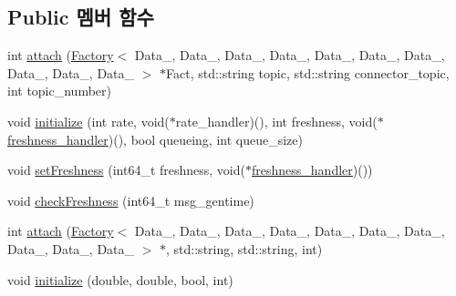 \subsection*{Public 멤버 함수}
\begin{DoxyCompactItemize}
\item 
int \hyperlink{classInputDataPort__Fac_a510e33d0b638c13d002e8e5bd0732ba5}{attach} (\hyperlink{classFactory}{Factory}$<$ Data\+\_, Data\+\_, Data\+\_, Data\+\_, Data\+\_, Data\+\_, Data\+\_, Data\+\_, Data\+\_, Data\+\_ $>$ $\ast$Fact, std\+::string topic, std\+::string connector\+\_\+topic, int topic\+\_\+number)
\item 
void \hyperlink{classInputDataPort__Fac_adc03c5ac76d6d2565a28fcd36e2c6fc8}{initialize} (int rate, void($\ast$rate\+\_\+handler)(), int freshness, void($\ast$\hyperlink{sample__main_8cpp_ae2b580f894f38496da91bce6c31e186f}{freshness\+\_\+handler})(), bool queueing, int queue\+\_\+size)
\item 
void \hyperlink{classInputDataPort__Fac_a57bb915c4c801305df78d70e3bcb8d5e}{set\+Freshness} (int64\+\_\+t freshness, void($\ast$\hyperlink{sample__main_8cpp_ae2b580f894f38496da91bce6c31e186f}{freshness\+\_\+handler})())
\item 
void \hyperlink{classInputDataPort__Fac_a8074c89d82913aa9be021549578b1212}{check\+Freshness} (int64\+\_\+t msg\+\_\+gentime)
\item 
int \hyperlink{classInputDataPort__Fac_a5d6fc1047ebdd54c3d6cf375b1f6d171}{attach} (\hyperlink{classFactory}{Factory}$<$ Data\+\_, Data\+\_, Data\+\_, Data\+\_, Data\+\_, Data\+\_, Data\+\_, Data\+\_, Data\+\_, Data\+\_ $>$ $\ast$, std\+::string, std\+::string, int)
\item 
void \hyperlink{classInputDataPort__Fac_af5dd3100caaa527c34079201e3297fdc}{initialize} (double, double, bool, int)
\end{DoxyCompactItemize}
